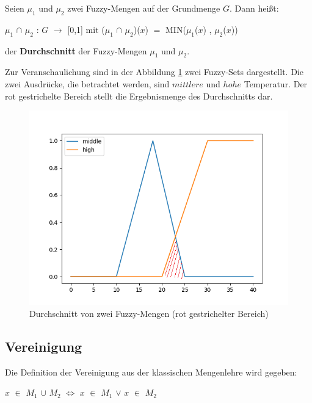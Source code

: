 \begin{definition}
	Seien $\mu_1$ und $\mu_2$ zwei Fuzzy-Mengen auf der Grundmenge $G$. Dann heißt:
	\begin{center}
		$\mu_1$ $\cap$ $\mu_2$ : $G$ $\rightarrow$ [0,1] $\text{mit}$ ($\mu_1$ $\cap$ $\mu_2$)($x$) $=$ MIN($\mu_1$($x$) , $\mu_2$($x$)) 
	\end{center}
	der \textbf{Durchschnitt} der Fuzzy-Mengen $\mu_1$ und $\mu_2$.
\end{definition} 

Zur Veranschaulichung sind in der Abbildung \ref{high_low_temp_intersection} zwei Fuzzy-Sets dargestellt. Die zwei Ausdrücke, die betrachtet werden, sind $mittlere$ und $hohe$ Temperatur. Der rot gestrichelte Bereich stellt die Ergebnismenge des Durchschnitts dar.

\begin{figure}[htbp]
	\centering
	\includegraphics[scale=0.5]{images/und_high_middle_temp.png}
	\caption{Durchschnitt von zwei Fuzzy-Mengen (rot gestrichelter Bereich)}\label{high_low_temp_intersection}
\end{figure}



\subsection{Vereinigung}

Die Definition der Vereinigung aus der klassischen Mengenlehre wird gegeben:
\begin{center}
	$x$  $\in$ $M_1$ $\cup$ $M_2$ $\Leftrightarrow$ $x$ $\in$ $M_1$ $\vee$ $x$ $\in$ $M_2$
\end{center}

